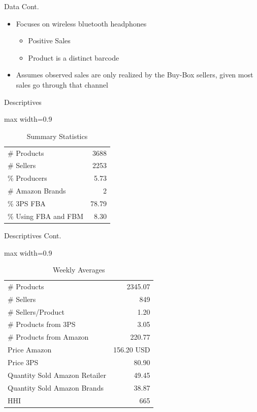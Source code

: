 \documentclass[aspectratio=169,professionalfonts]{beamer}
\begin{document}
\begin{frame}{Data Cont.}
  \begin{itemize}
    \item Focuses on wireless bluetooth headphones
    \begin{itemize}
      \item Positive Sales
      \item Product is a distinct barcode
    \end{itemize}
    \item Assumes observed sales are only realized by the Buy-Box sellers, given most sales go through that channel
  \end{itemize}
\end{frame}

\begin{frame}{Descriptives}
  \begin{table}
    \centering
    \caption{Summary Statistics}
    \begin{adjustbox}{max width=0.9\linewidth}
      \begin{tabular}{lr}
        # Products & 3688 \\
        # Sellers & 2253 \\
        \% Producers & 5.73 \\
        # Amazon Brands & 2 \\
        \% 3PS FBA & 78.79 \\
        \% Using FBA and FBM & 8.30
      \end{tabular}
    \end{adjustbox}
  \end{table}
\end{frame}

\begin{frame}{Descriptives Cont.}
  \begin{table}
    \centering
    \caption{Weekly Averages}
    \begin{adjustbox}{max width=0.9\linewidth}
      \begin{tabular}{lr}
        # Products & 2345.07 \\
        # Sellers & 849 \\
        # Sellers/Product & 1.20 \\
        # Products from 3PS & 3.05 \\
        # Products from Amazon & 220.77 \\
        Price Amazon & 156.20 USD \\
        Price 3PS & 80.90 \\
        Quantity Sold Amazon Retailer & 49.45 \\
        Quantity Sold Amazon Brands & 38.87 \\
        HHI & 665
      \end{tabular}
    \end{adjustbox}
  \end{table}
\end{frame}
\end{document}
